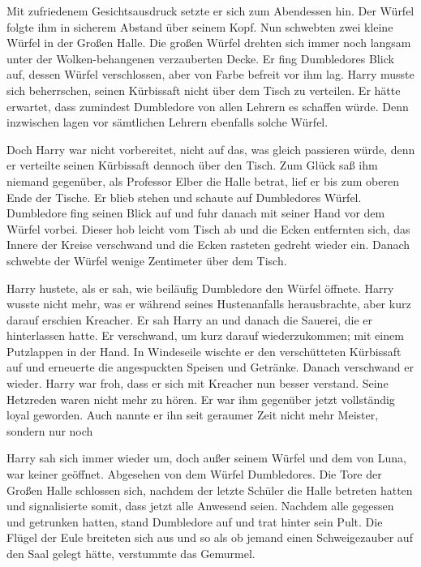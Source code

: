 Mit zufriedenem Gesichtsausdruck setzte er sich zum Abendessen hin. Der Würfel folgte ihm in sicherem Abstand über seinem Kopf. Nun schwebten zwei kleine Würfel in der Großen Halle. Die großen Würfel drehten sich immer noch langsam unter der Wolken-behangenen verzauberten Decke. Er fing Dumbledores Blick auf, dessen Würfel verschlossen, aber von Farbe befreit vor ihm lag. Harry musste sich beherrschen, seinen Kürbissaft nicht über dem Tisch zu verteilen. Er hätte erwartet, dass zumindest Dumbledore von allen Lehrern es schaffen würde. Denn inzwischen lagen vor sämtlichen Lehrern ebenfalls solche Würfel.

Doch Harry war nicht vorbereitet, nicht auf das, was gleich passieren würde, denn er verteilte seinen Kürbissaft dennoch über den Tisch. Zum Glück saß ihm niemand gegenüber, als Professor Elber die Halle betrat, lief er bis zum oberen Ende der Tische. Er blieb stehen und schaute auf Dumbledores Würfel. Dumbledore fing seinen Blick auf und fuhr danach mit seiner Hand vor dem Würfel vorbei. Dieser hob leicht vom Tisch ab und die Ecken entfernten sich, das Innere der Kreise verschwand und die Ecken rasteten gedreht wieder ein. Danach schwebte der Würfel wenige Zentimeter über dem Tisch.

Harry hustete, als er sah, wie beiläufig Dumbledore den Würfel öffnete. Harry wusste nicht mehr, was er während seines Hustenanfalls herausbrachte, aber kurz darauf erschien Kreacher. Er sah Harry an und danach die Sauerei, die er hinterlassen hatte. Er verschwand, um kurz darauf wiederzukommen; mit einem Putzlappen in der Hand. In Windeseile wischte er den verschütteten Kürbissaft auf und erneuerte die angespuckten Speisen und Getränke. Danach verschwand er wieder. Harry war froh, dass er sich mit Kreacher nun besser verstand. Seine Hetzreden waren nicht mehr zu hören. Er war ihm gegenüber jetzt vollständig loyal geworden. Auch nannte er ihn seit geraumer Zeit nicht mehr Meister, sondern nur noch 

Harry sah sich immer wieder um, doch außer seinem Würfel und dem von Luna, war keiner geöffnet. Abgesehen von dem Würfel Dumbledores. Die Tore der Großen Halle schlossen sich, nachdem der letzte Schüler die Halle betreten hatten und signalisierte somit, dass jetzt alle Anwesend seien. Nachdem alle gegessen und getrunken hatten, stand Dumbledore auf und trat hinter sein Pult. Die Flügel der Eule breiteten sich aus und so als ob jemand einen Schweigezauber auf den Saal gelegt hätte, verstummte das Gemurmel.

